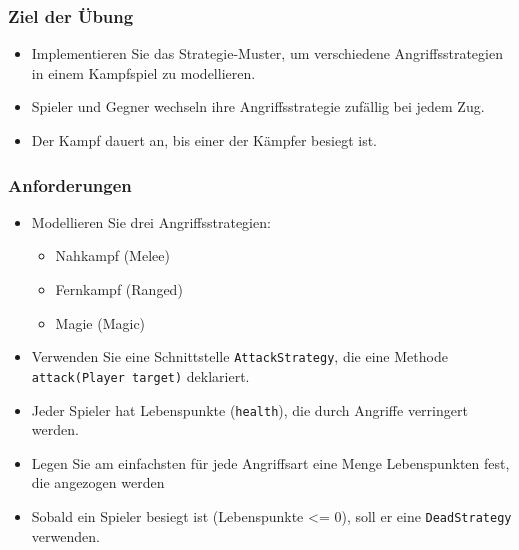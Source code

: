 \begin{frame}
    \frametitle{Ziel der Übung}
    \begin{itemize}
        \item Implementieren Sie das Strategie-Muster, um verschiedene Angriffsstrategien in einem Kampfspiel zu modellieren.
        \item Spieler und Gegner wechseln ihre Angriffsstrategie zufällig bei jedem Zug.
        \item Der Kampf dauert an, bis einer der Kämpfer besiegt ist.
    \end{itemize}
\end{frame}

\begin{frame}
    \frametitle{Anforderungen}
    \begin{itemize}
        \item Modellieren Sie drei Angriffsstrategien:
        \begin{itemize}
            \item Nahkampf (Melee)
            \item Fernkampf (Ranged)
            \item Magie (Magic)
        \end{itemize}
        \item Verwenden Sie eine Schnittstelle \texttt{AttackStrategy}, die eine Methode \texttt{attack(Player target)} deklariert.
        \item Jeder Spieler hat Lebenspunkte (\texttt{health}), die durch Angriffe verringert werden.
        \item Legen Sie am einfachsten für jede Angriffsart eine Menge Lebenspunkten fest, die angezogen werden
        \item Sobald ein Spieler besiegt ist (Lebenspunkte <= 0), soll er eine \texttt{DeadStrategy} verwenden.
    \end{itemize}
\end{frame}

